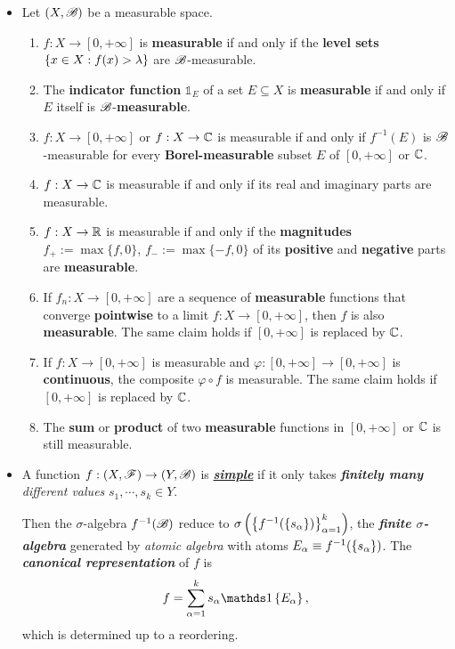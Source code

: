 \documentclass[11pt]{article}
\begin{document}
\begin{itemize}
\item \begin{proposition}
Let $(X, {\mathscr B})$ be a measurable space.
\begin{enumerate}
\item $f : X \rightarrow [0, +\infty]$ is \textbf{measurable} if and only if the \textbf{level sets} $\left\{x \in X : f(x) > \lambda\right\}$ are ${\mathscr B}$-measurable.
\item The \textbf{indicator function} $\mathds{1}_E$ of a set $E \subseteq X$ is \textbf{measurable} if and only if $E$ itself is ${\mathscr B}$-\textbf{measurable}.
\item $f : X \rightarrow [0, +\infty]$ or $f: X \rightarrow {\mathbb C}$ is measurable if and only if $f^{-1}(E)$ is ${\mathscr B}$-measurable for every \textbf{Borel-measurable} subset $E$ of $[0, +\infty]$ or ${\mathbb C}$.
\item $f: X \rightarrow {\mathbb C}$ is measurable if and only if its real and imaginary parts are measurable.
\item $f: X \rightarrow {\mathbb R}$ is measurable if and only if the \textbf{magnitudes} $f_{+} := \max\{f, 0\}$, $f_{-} := \max\{-f, 0\}$ of its \textbf{positive} and \textbf{negative} parts are \textbf{measurable}.
\item  If $f_n : X \rightarrow [0, +\infty]$ are a sequence of \textbf{measurable} functions that converge \textbf{pointwise} to a limit $f : X \rightarrow [0, +\infty]$, then $f$ is also \textbf{measurable}. The same claim holds if $[0, +\infty]$ is replaced by ${\mathbb C}$.
\item  If $f : X \rightarrow [0, +\infty]$ is measurable and $\varphi: [0, +\infty] \rightarrow [0, +\infty]$ is \textbf{continuous}, the composite $\varphi \circ f$ is measurable. The same claim holds if $[0, +\infty]$ is replaced by ${\mathbb C}$.
\item The \textbf{sum} or \textbf{product} of two \textbf{measurable} functions in $[0, +\infty]$ or ${\mathbb C}$ is still measurable.
\end{enumerate}
\end{proposition}

\item  \begin{definition} 
A function $f: (X,{\mathscr F})\rightarrow (Y,{\mathscr B})$ is \underline{\emph{\textbf{simple}}} if it only takes \emph{\textbf{finitely many} different values} $s_{1},\cdots, s_{k}\in Y$. 

Then the $\sigma$-algebra $f^{-1}({\mathscr B})$ reduce to $\sigma\left(\left\{f^{-1}(\left\{s_{\alpha}\right\})\right\}_{\alpha=1}^{k}\right)$, the \emph{\textbf{finite $\sigma$-algebra}} generated by \emph{atomic algebra} with atoms $E_{\alpha}\equiv f^{-1}(\left\{s_{\alpha}\right\})$. The \emph{\textbf{canonical representation}} of $f$ is 
\begin{align*}
f = \sum_{\alpha=1}^{k}s_{\alpha}\ind{E_{\alpha}},
\end{align*}
which is determined up to a reordering.
\end{definition}



\end{itemize}
\end{document}
